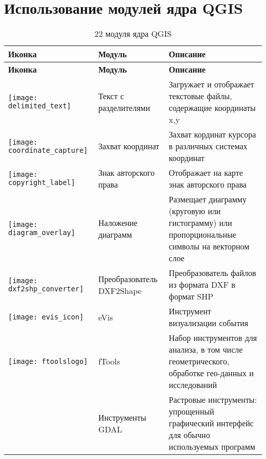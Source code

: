 
\chapter{Использование модулей ядра QGIS}\label{sec:core_plugins}


{\setlength{\extrarowheight}{15pt}
\small
\begin{longtable}{|p{1.2cm}|p{3.8cm}|p{10.5cm}|}
\caption{22 модуля ядра QGIS }\label{tab:core_plugins} \\
\hline
 \textbf{Иконка} & \textbf{Модуль} & \textbf{Описание}\\
\endfirsthead
\hline
\textbf{Иконка} & \textbf{Модуль} & \textbf{Описание}\\
\endhead
\hline
\texttt{[image: delimited\_text]}
 & Текст с разделителями \index{plugins!delimited text} & Загружает и отображает текстовые файлы, содержащие координаты x,y\\
\hline
\texttt{[image: coordinate\_capture]}
 & Захват координат \index{plugins!coordinate capture}& Захват кординат курсора в различных системах координат\\
\hline
\texttt{[image: copyright\_label]}
 & Знак авторского права \index{plugins!copyright}& Отображает на карте знак авторского права\\
\hline
\texttt{[image: diagram\_overlay]}
 & Наложение диаграмм \index{plugins!diagram}& Размещает диаграмму (круговую или гистограмму) или пропорциональные символы на векторном слое\\
\hline
\texttt{[image: dxf2shp\_converter]}
 & Преобразователь DXF2Shape \index{plugins!DXF2Shape}& Преобразователь файлов из формата DXF в формат SHP\\
\hline
\texttt{[image: evis\_icon]}
 & eVis & Инструмент визуализации события \\
\hline
\texttt{[image: ftoolslogo]}
 & fTools \index{plugins!ftools}& Набор инструментов для анализа, в том числе геометрического, обработке гео-данных и исследований \\
\hline
 & Инструменты GDAL \index{plugins!gdaltools} & Растровые инструменты: упрощенный графический интерфейс для обычно используемых программ\\

\end{longtable}}
